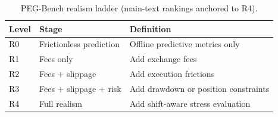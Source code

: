 \begin{table}[t]
\centering
\caption{PEG-Bench realism ladder (main-text rankings anchored to R4).}
\label{tab:table_10_realism_ladder}
\begin{tabular}{lll}
\toprule
Level & Stage & Definition \\
\midrule
R0 & Frictionless prediction & Offline predictive metrics only \\
R1 & Fees only & Add exchange fees \\
R2 & Fees + slippage & Add execution frictions \\
R3 & Fees + slippage + risk & Add drawdown or position constraints \\
R4 & Full realism & Add shift-aware stress evaluation \\
\bottomrule
\end{tabular}
\end{table}
